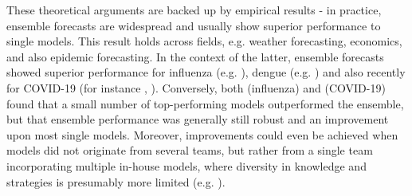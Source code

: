 These theoretical arguments are backed up by empirical results - in practice, ensemble forecasts are widespread and usually show superior performance to single models. This result holds across fields, e.g. weather forecasting, economics, and also epidemic forecasting. In the context of the latter, ensemble forecasts showed superior performance for influenza (e.g. \cite{reich_collaborative_2022}), dengue (e.g. \cite{johansson_open_2019}) and also recently for COVID-19 (for instance \cite{cramer_evaluation_2022}, \cite{sherratt_european_2022}). Conversely, both \cite{mcgowan_collaborative_2019} (influenza) and \cite{bracher_pre-registered_2021} (COVID-19) found that a small number of top-performing models outperformed the ensemble, but that ensemble performance was generally still robust and an improvement upon most single models. Moreover, improvements could even be achieved when models did not originate from several teams, but rather from a single team incorporating multiple in-house models, where diversity in knowledge and strategies is presumably more limited (e.g. \cite{reich_collaborative_2019}).\\
